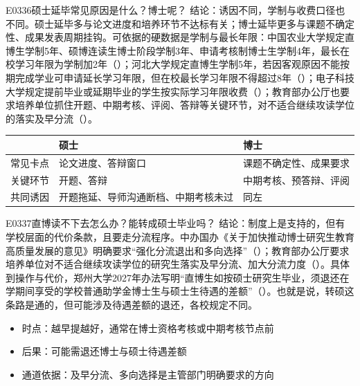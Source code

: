 \begin{qa}{E0336}{硕士延毕常见原因是什么？博士呢？}
结论：诱因不同，学制与收费口径也不同。硕士延毕多与论文进度和培养环节不达标有关；博士延毕更多与课题不确定性、成果发表周期挂钩。可依据的硬数据是学制与最长年限：中国农业大学规定直博生学制5年、硕博连读生博士阶段学制3年、申请考核制博士生学制4年，最长在校学习年限为学制加2年（）；河北大学规定直博生学制5年，若因客观原因不能按期完成学业可申请延长学习年限，但在校最长学习年限不得超过8年（）；电子科技大学规定提前毕业或延期毕业的学生按实际学习年限收费（）；教育部办公厅也要求培养单位抓住开题、中期考核、评阅、答辩等关键环节，对不适合继续攻读学位的落实及早分流（）。

\par\vspace{2pt}\nobreak\begin{center}\footnotesize
\begin{tabularx}{\textwidth}{>{\raggedright\arraybackslash}X>{\raggedright\arraybackslash}X>{\raggedright\arraybackslash}X}
\toprule
\textbf{} & \textbf{硕士} & \textbf{博士} \\ \midrule
常见卡点 & 论文进度、答辩窗口 & 课题不确定性、成果要求 \\
关键环节 & 开题、答辩 & 中期考核、预答辩、评阅 \\
共同诱因 & 开题拖延、导师沟通断档、中期考核未过 & 同左 \\
\bottomrule
\end{tabularx}
\end{center}\vspace{2pt}\par
{}
\end{qa}

\begin{qa}{E0337}{直博读不下去怎么办？能转成硕士毕业吗？}
结论：制度上是支持的，但有学校层面的代价条款，且要走分流程序。中办国办《关于加快推动博士研究生教育高质量发展的意见》明确要求“强化分流退出和多向选择”（）；教育部办公厅要求培养单位对不适合继续攻读学位的研究生落实及早分流、加大分流力度（）。具体到操作与代价，郑州大学2027年办法写明“直博生如按硕士研究生毕业，须退还在学期间享受的学校普通助学金博士生与硕士生待遇的差额”（）。也就是说，转硕这条路是通的，但可能涉及待遇差额的退还，各校规定不同。

\begin{itemize}
  \item 时点：越早提越好，通常在博士资格考核或中期考核节点前
  \item 后果：可能需退还博士与硕士待遇差额
  \item 通道依据：及早分流、多向选择是主管部门明确要求的方向
\end{itemize}
\end{qa}

